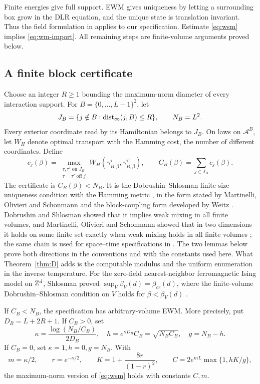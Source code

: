 Finite energies give full support. EWM gives uniqueness by letting a surrounding box grow in the DLR equation, and the unique state is translation invariant. Thus the field formulation in \cite{spinka} applies to our specification. Estimate \eqref{eq:wsm} implies \eqref{eq:wm-import}. All remaining steps are finite-volume arguments proved below.

\subsection{A finite block certificate}

Choose an integer \(R\ge1\) bounding the maximum-norm diameter of every interaction support. For \(B=\{0,\ldots,L-1\}^2\), let
\[
J_B=\{j\notin B:\operatorname{dist}_\infty(j,B)\le R\},\qquad N_B=L^2.
\]
Every exterior coordinate read by its Hamiltonian belongs to \(J_B\). On laws on \(\mathcal A^B\), let \(W_H\) denote optimal transport with the Hamming cost, the number of different coordinates. Define
\begin{equation}\label{eq:block-certificate}
c_j(\beta)=\max_{\substack{\tau,\tau'\text{ on }J_B\\
                    \tau=\tau'\text{ off }j}}
W_H(\gamma_{B,\beta}^\tau,\gamma_{B,\beta}^{\tau'}),
\qquad C_B(\beta)=\sum_{j\in J_B}c_j(\beta).
\end{equation}
The certificate is \(C_B(\beta)<N_B\). It is the Dobrushin--Shlosman finite-size uniqueness condition with the Hamming metric \cite{dsConstructive}, in the form stated by Martinelli, Olivieri and Schonmann \cite[Section~3]{mos} and the block-coupling form developed by Weitz \cite{weitz}. Dobrushin and Shlosman showed that it implies weak mixing in all finite volumes, and Martinelli, Olivieri and Schonmann showed that in two dimensions it holds on some finite set exactly when weak mixing holds in all finite volumes \cite[Theorems~3.1 and~3.2]{mos}; the same chain is used for space--time specifications in \cite[Theorem~12.1]{dmSpaceTime}. The two lemmas below prove both directions in the conventions and with the constants used here. What Theorem~\ref{thm:D} adds is the computable modulus and the uniform enumeration in the inverse temperature. For the zero-field nearest-neighbor ferromagnetic Ising model on \(\mathbb Z^d\), Shlosman proved \(\sup_V\beta_V(d)=\beta_{cr}(d)\), where the finite-volume Dobrushin--Shlosman condition on \(V\) holds for \(\beta<\beta_V(d)\) \cite[Theorem~4]{shlosmanDS}.

\begin{lemma}\label{lem:block-sufficient}
If \(C_B<N_B\), the specification has arbitrary-volume EWM. More precisely, put \(D_B=L+2R+1\). If \(C_B>0\), set
\[
\kappa=\frac{\log(N_B/C_B)}{2D_B},\quad
h=e^{\kappa D_B}C_B=\sqrt{N_BC_B},\quad g=N_B-h.
\]
If \(C_B=0\), set \(\kappa=1,h=0,g=N_B\). With
\[
m=\kappa/2,\qquad r=e^{-\kappa/2},\qquad
K=1+\frac{8r}{(1-r)^2},\qquad
C=2e^{mL}\max\{1,hK/g\},
\]
the maximum-norm version of \eqref{eq:wsm} holds with constants \(C,m\).
\end{lemma}


